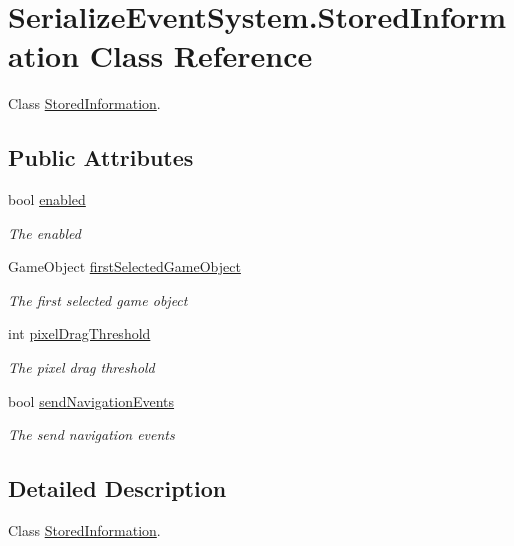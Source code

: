 \hypertarget{class_serialize_event_system_1_1_stored_information}{}\section{Serialize\+Event\+System.\+Stored\+Information Class Reference}
\label{class_serialize_event_system_1_1_stored_information}


Class \hyperlink{class_serialize_event_system_1_1_stored_information}{Stored\+Information}.  


\subsection*{Public Attributes}
\begin{DoxyCompactItemize}
\item 
bool \hyperlink{class_serialize_event_system_1_1_stored_information_aba544e4d75c5c4178b25a5465ce8a4a0}{enabled}
\begin{DoxyCompactList}\small\item\em The enabled \end{DoxyCompactList}\item 
Game\+Object \hyperlink{class_serialize_event_system_1_1_stored_information_a8fd79365c55621844ee467dd188e4cec}{first\+Selected\+Game\+Object}
\begin{DoxyCompactList}\small\item\em The first selected game object \end{DoxyCompactList}\item 
int \hyperlink{class_serialize_event_system_1_1_stored_information_a25f5b619e8acbcafe57dbc9ea2adbb70}{pixel\+Drag\+Threshold}
\begin{DoxyCompactList}\small\item\em The pixel drag threshold \end{DoxyCompactList}\item 
bool \hyperlink{class_serialize_event_system_1_1_stored_information_a33a91656b50f4b8030d2caf7a44fff11}{send\+Navigation\+Events}
\begin{DoxyCompactList}\small\item\em The send navigation events \end{DoxyCompactList}\end{DoxyCompactItemize}


\subsection{Detailed Description}
Class \hyperlink{class_serialize_event_system_1_1_stored_information}{Stored\+Information}. 



